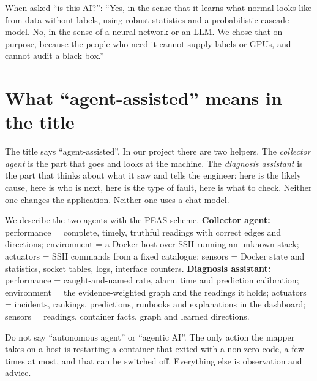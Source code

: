 \begin{saybox}
When asked ``is this AI?'': ``Yes, in the sense that it learns what normal looks like from data without labels, using robust statistics and a probabilistic cascade model. No, in the sense of a neural network or an LLM. We chose that on purpose, because the people who need it cannot supply labels or GPUs, and cannot audit a black box.''
\end{saybox}

\section{What ``agent-assisted'' means in the title}
\begin{simplebox}
The title says ``agent-assisted''. In our project there are two helpers. The \emph{collector agent} is the part that goes and looks at the machine. The \emph{diagnosis assistant} is the part that thinks about what it saw and tells the engineer: here is the likely cause, here is who is next, here is the type of fault, here is what to check. Neither one changes the application. Neither one uses a chat model.
\end{simplebox}

\begin{techbox}
We describe the two agents with the PEAS scheme. \textbf{Collector agent:} performance = complete, timely, truthful readings with correct edges and directions; environment = a Docker host over SSH running an unknown stack; actuators = SSH commands from a fixed catalogue; sensors = Docker state and statistics, socket tables, logs, interface counters. \textbf{Diagnosis assistant:} performance = caught-and-named rate, alarm time and prediction calibration; environment = the evidence-weighted graph and the readings it holds; actuators = incidents, rankings, predictions, runbooks and explanations in the dashboard; sensors = readings, container facts, graph and learned directions.
\end{techbox}

\begin{warnbox}
Do not say ``autonomous agent'' or ``agentic AI''. The only action the mapper takes on a host is restarting a container that exited with a non-zero code, a few times at most, and that can be switched off. Everything else is observation and advice.
\end{warnbox}
